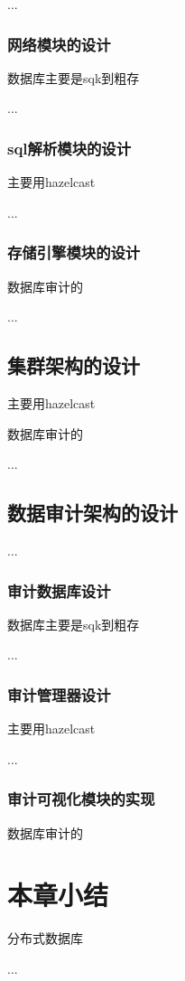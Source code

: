 ...
\subsubsection*{网络模块的设计}
数据库主要是sqk到粗存

...
\subsubsection*{sql解析模块的设计}
主要用hazelcast

...
\subsubsection*{存储引擎模块的设计}
数据库审计的

...
\subsection{集群架构的设计}
主要用hazelcast


数据库审计的

...
\subsection{数据审计架构的设计}
...
\subsubsection*{审计数据库设计}
数据库主要是sqk到粗存

...
\subsubsection*{审计管理器设计}
主要用hazelcast

...
\subsubsection*{审计可视化模块的实现}
数据库审计的
\section{本章小结}
分布式数据库

...